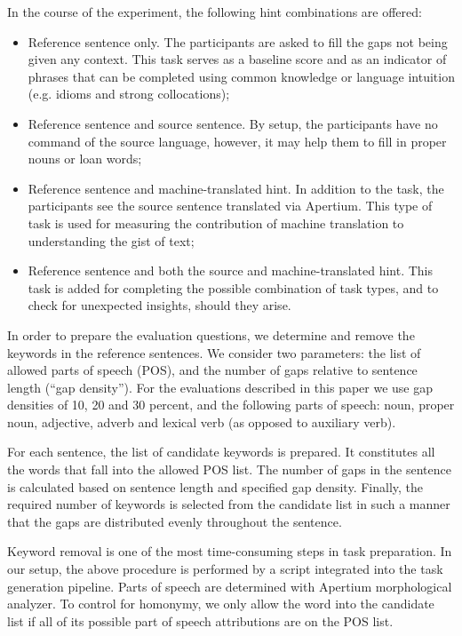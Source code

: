 \documentclass[11pt]{article}
\newcommand{\comment}[1]{\marginpar{\scriptsize\sf \textcolor{blue}{#1}}}
\begin{document}
\comment{EA: I don't really have a good explanation why we used source+mt tasks, except for being exhaustive. could you suggest anything?}
In the course of the experiment, the following hint combinations are offered:
\begin{itemize}
\item  Reference sentence only. The participants are asked to fill the gaps not being given
any context. This task serves as a baseline score and as an indicator of phrases
that can be completed using common knowledge or language intuition (e.g.
idioms and strong collocations);
\item  Reference sentence and source sentence. By setup, the
participants have no command of the source language, however, it may help them to fill
in proper nouns or loan words;
\item  Reference sentence and machine-translated hint. In addition to the task, the
participants see the source sentence translated via Apertium. This type of task is
used for measuring the contribution of machine translation to understanding the
gist of text;
\item  Reference sentence and both the source and machine-translated hint. This task is
added for completing the possible combination of task types, and to check
for unexpected insights, should they arise.
\end{itemize}

In order to prepare the evaluation questions, we determine and remove the keywords in the reference sentences. We consider two parameters: the list of allowed parts of speech (POS), and the number of gaps relative to sentence length (``gap density''). For the evaluations described in this paper we use gap densities of 10, 20 and 30 percent, and the following parts of speech: noun, proper noun, adjective, adverb and lexical verb (as opposed to auxiliary verb).

For each sentence, the list of candidate keywords is prepared. It constitutes all the words that fall into the allowed POS list. The number of gaps in the sentence is calculated based on sentence length and specified gap density. Finally, the required number of keywords is selected from the candidate list in such a manner that the gaps are distributed evenly throughout the sentence.

Keyword removal is one of the most time-consuming steps in task preparation. In our setup, the above procedure is performed by a script integrated into the task generation pipeline. Parts of speech are determined with Apertium morphological analyzer. To control for homonymy, we only allow the word into the candidate list if all of its possible part of speech attributions are on the POS list. 
\end{document}
